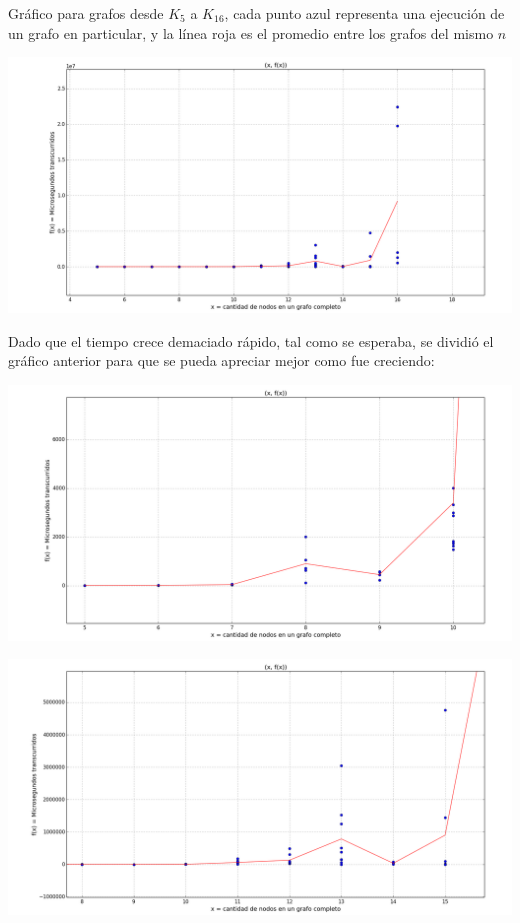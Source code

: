 Gr\'afico para grafos desde $K_5$ a $K_{16}$, cada punto azul representa una ejecuci\'on de un grafo en particular, y la l\'inea roja es el promedio entre los grafos del mismo $n$
\begin{center}
	\includegraphics[scale=0.41]{img/exacto/fx_n_todo.png}
\end{center}

Dado que el tiempo crece demaciado r\'apido, tal como se esperaba, se dividi\'o el gr\'afico anterior para que se pueda apreciar mejor como fue creciendo:
\begin{center}
	\includegraphics[scale=0.41]{img/exacto/fx_n_5_10.png}
\end{center}

\begin{center}
	\includegraphics[scale=0.41]{img/exacto/fx_n_8_15.png}
\end{center}

